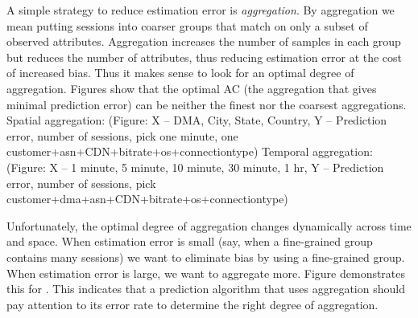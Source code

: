 A simple strategy to reduce estimation error is {\it aggregation}.  By aggregation we mean putting sessions into coarser groups that match on only a subset of observed attributes.  Aggregation increases the number of samples in each group but reduces the number of attributes, thus reducing estimation error at the cost of increased bias.  Thus it makes sense to look for an optimal degree of aggregation.  Figures \fillme show that the optimal AC (the aggregation that gives minimal prediction error) can be neither the finest nor the coarsest aggregations.
Spatial aggregation: (Figure: X -- DMA, City, State, Country, Y -- Prediction error, number of sessions, pick one minute, one customer+asn+CDN+bitrate+os+connectiontype)
Temporal aggregation: (Figure: X -- 1 minute, 5 minute, 10 minute, 30 minute, 1 hr, Y -- Prediction error, number of sessions, pick customer+dma+asn+CDN+bitrate+os+connectiontype)

Unfortunately, the optimal degree of aggregation changes dynamically across time and space.  When estimation error is small (say, when a fine-grained group contains many sessions) we want to eliminate bias by using a fine-grained group.  When estimation error is large, we want to aggregate more.  Figure \fillme demonstrates this for \fillme.  This indicates that a prediction algorithm that uses aggregation should pay attention to its error rate to determine the right degree of aggregation.